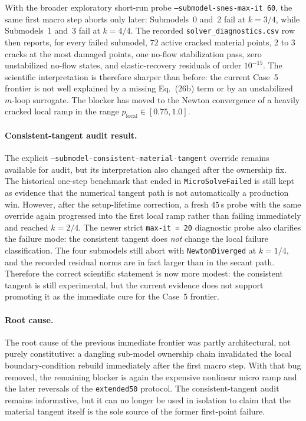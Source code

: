 With the broader exploratory short-run probe
\texttt{--submodel-snes-max-it 60}, the same first macro step aborts only
later: Submodels~0 and~2 fail at \(k=3/4\), while Submodels~1 and~3 fail at
\(k=4/4\).  The recorded \texttt{solver\_diagnostics.csv} row then reports,
for every failed submodel, \(72\) active cracked material points, \(2\) to
\(3\) cracks at the most damaged points, one no-flow stabilization pass, zero
unstabilized no-flow states, and elastic-recovery residuals of order
\(10^{-15}\).  The scientific interpretation is therefore sharper than before:
the current Case~5 frontier is not well explained by a missing Eq.~(26b) term
or by an unstabilized \(m\)-loop surrogate.  The blocker has moved to the
Newton convergence of a heavily cracked local ramp in the range
\(p_{\mathrm{local}}\in[0.75,1.0]\).

\paragraph{Consistent-tangent audit result.}
The explicit
\texttt{--submodel-consistent-material-tangent} override remains available for
audit, but its interpretation also changed after the ownership fix.  The
historical one-step benchmark that ended in \texttt{MicroSolveFailed} is still
kept as evidence that the numerical tangent path is not automatically a
production win.  However, after the setup-lifetime correction, a fresh
\(45\)\,s probe with the same override again progressed into the first local
ramp rather than failing immediately and reached \(k=2/4\).  The newer
strict \texttt{max-it = 20} diagnostic probe also clarifies the failure mode:
the consistent tangent does \emph{not} change the local failure classification.
The four submodels still abort with \texttt{NewtonDiverged} at \(k=1/4\), and
the recorded residual norms are in fact larger than in the secant path.
Therefore the correct scientific statement is now more modest: the consistent
tangent is still experimental, but the current evidence does not support
promoting it as the immediate cure for the Case~5 frontier.

\paragraph{Root cause.}
The root cause of the previous immediate frontier was partly architectural, not
purely constitutive: a dangling sub-model ownership chain invalidated the local
boundary-condition rebuild immediately after the first macro step.  With that
bug removed, the remaining blocker is again the expensive nonlinear micro ramp
and the later reversals of the \texttt{extended50} protocol.  The
consistent-tangent audit remains informative, but it can no longer be used in
isolation to claim that the material tangent itself is the sole source of the
former first-point failure.

